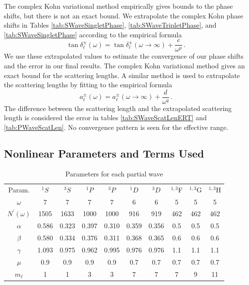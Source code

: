 \documentclass[preprint,showpacs,showkeys,preprintnumbers,amsmath,amssymb,longbibliography,pra,aps]{revtex4-1}
\begin{document}
The complex Kohn variational method empirically gives bounds
to the phase shifts, but there is not an exact bound.
We extrapolate the complex Kohn phase shifts in Tables
\ref{tab:SWaveSingletPhase}, \ref{tab:SWaveTripletPhase}, and
\ref{tab:SWaveSingletPhase} according to the empirical formula
\cite{VanReeth2003}
\begin{equation}
\label{eq:Extrap}
\tan\delta_\ell^\pm(\omega) = \tan\delta_\ell^\pm(\omega\to\infty) +
  \frac{c}{\omega^p}\, .
\end{equation}
We use these extrapolated values to estimate the convergence of our phase 
shifts and the error in our final results. The complex Kohn variational
method gives an exact bound for the scattering lengths.
A similar method is used to
extrapolate the scattering lengths by fitting to the empirical formula
\begin{equation}
\label{eq:ExtrapA}
a_\ell^\pm(\omega) = a_\ell^\pm(\omega\to\infty) + \frac{d}{\omega^q}\, .
\end{equation}
The difference between the scattering length and the extrapolated scattering 
length is considered the error in tables \ref{tab:SWaveScatLenERT} and
\ref{tab:PWaveScatLen}. No convergence pattern is seen for the effective range.

\subsection{Nonlinear Parameters and Terms Used}
\label{sec:Parameters}

\begin{table}[H]
  \centering
	\begin{ruledtabular}
    \begin{tabular}{cccccccccc}
    Param. & $^1S$ & $^3S$ & $^1P$ & $^3P$ & $^1D$ & $^3D$ & $^{1,3}$F & $^{1,3}$G & $^{1,3}$H \\
    \colrule
	$\omega$           & 7     & 7     & 7     & 7     & 6     & 6     & 5    & 5   & 5 \\
	$N^\prime(\omega)$ & 1505  & 1633  & 1000  & 1000  & 916   & 919   & 462  & 462 & 462 \\
	$\alpha$           & 0.586 & 0.323 & 0.397 & 0.310 & 0.359 & 0.356 & 0.5  & 0.5 & 0.5 \\
	$\beta$            & 0.580 & 0.334 & 0.376 & 0.311 & 0.368 & 0.365 & 0.6  & 0.6 & 0.6 \\
	$\gamma$           & 1.093 & 0.975 & 0.962 & 0.995 & 0.976 & 0.976 & 1.1  & 1.1 & 1.1 \\
	$\mu$              & 0.9   & 0.9   & 0.9   & 0.9   & 0.7   & 0.7   & 0.7  & 0.7 & 0.7 \\
	$m_\ell$           & 1     & 1     & 3     & 3     & 7     & 7     & 7    & 9   & 11 \\
    \end{tabular}
  \end{ruledtabular}
  \caption{Parameters for each partial wave}
  \label{tab:Nonlinear}
\end{table}
\end{document}
